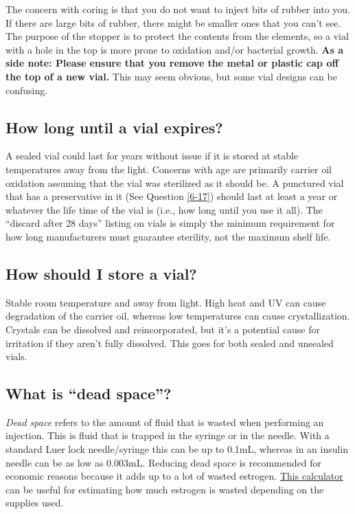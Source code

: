 \documentclass{article}
\begin{document}
The concern with coring is that you do not want to inject bits of rubber into you. If there are large bits of rubber, there might be smaller ones that you can't see. The purpose of the stopper is to protect the contents from the elements, so a vial with a hole in the top is more prone to oxidation and/or bacterial growth. \textbf{As a side note: Please ensure that you remove the metal or plastic cap off the top of a new vial. }This may seem obvious, but some vial designs can be confusing. 

\subsection{How long until a vial expires?}

A sealed vial could last for years without issue if it is stored at stable temperatures away from the light. Concerns with age are primarily carrier oil oxidation assuming that the vial was sterilized as it should be. A punctured vial that has a preservative in it (See Question \ref{6-17}) should last at least a year or whatever the life time of the vial is (i.e., how long until you use it all). The “discard after 28 days” listing on vials is simply the minimum requirement for how long manufacturers must guarantee sterility, not the maximum shelf life. 

\subsection{How should I store a vial?}

Stable room temperature and away from light. High heat and UV can cause degradation of the carrier oil, whereas low temperatures can cause crystallization. Crystals can be dissolved and reincorporated, but it’s a potential cause for irritation if they aren’t fully dissolved. This goes for both sealed and unsealed vials.

\subsection{What is “dead space”?}\label{5-26}

\textit{Dead space} refers to the amount of fluid that is wasted when performing an injection. This is fluid that is trapped in the syringe or in the needle. With a standard Luer lock needle/syringe this can be up to 0.1mL, whereas in an insulin needle can be as low as 0.003mL. Reducing dead space is recommended for economic reasons because it adds up to a lot of wasted estrogen. \href{https://hrtcafe.net/Calc/}{This calculator} can be useful for estimating how much estrogen is wasted depending on the supplies used.
\end{document}
